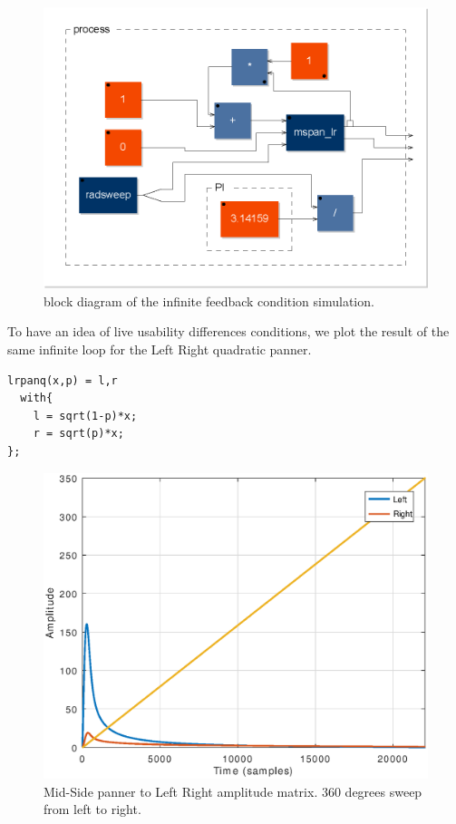 \documentclass{article}
\begin{document}
\begin{figure}[h]
\centering
\includegraphics[width=1\columnwidth]{mspanlrfb_diagram}
\caption{block diagram of the infinite feedback condition simulation.}
\label{fig:mspan}
\end{figure}

To have an idea of live usability differences conditions, we plot the result of the same infinite loop for the Left Right quadratic panner. 

\begin{lstlisting}
lrpanq(x,p) = l,r
  with{
    l = sqrt(1-p)*x;
    r = sqrt(p)*x;
};
\end{lstlisting}

\begin{figure}[h]
\centering
\includegraphics[width=1\columnwidth]{lrpanfbpot1}
\caption{Mid-Side panner to Left Right amplitude matrix. 360 degrees sweep from left to right.\label{fig:mspanlr}}
\end{figure}
\end{document}
